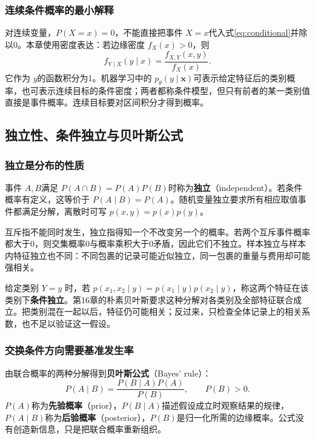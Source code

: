 \documentclass[UTF8,fontset=none,zihao=-4,a4paper]{ctexart}
\newcommand{\term}[1]{\textbf{#1}}
\numberwithin{equation}{section}
\numberwithin{figure}{section}
\begin{document}
\subsubsection{连续条件概率的最小解释}
对连续变量，$P(X=x)=0$，不能直接把事件 $X=x$代入式\eqref{eq:conditional}并除以0。本章使用密度表达：若边缘密度 $f_X(x)>0$，则
\[
 f_{Y\mid X}(y\mid x)=\frac{f_{X,Y}(x,y)}{f_X(x)}.
\]
它作为 $y$的函数积分为1。机器学习中的 $p_\theta(y\mid\symbf x)$可表示给定特征后的类别概率，也可表示连续目标的条件密度；两者都称条件模型，但只有前者的某一类别值直接是事件概率。连续目标要对区间积分才得到概率。

\subsection{独立性、条件独立与贝叶斯公式}
\subsubsection{独立是分布的性质}
事件 $A,B$满足 $P(A\cap B)=P(A)P(B)$时称为\term{独立}（independent）。若条件概率有定义，这等价于 $P(A\mid B)=P(A)$。随机变量独立要求所有相应取值事件都满足分解，离散时可写 $p(x,y)=p(x)p(y)$。

互斥指不能同时发生，独立指得知一个不改变另一个的概率。若两个互斥事件概率都大于0，则交集概率0与概率乘积大于0矛盾，因此它们不独立。样本独立与样本内特征独立也不同：不同包裹的记录可能近似独立，同一包裹的重量与费用却可能强相关。

给定类别 $Y=y$ 时，若 $p(x_1,x_2\mid y)=p(x_1\mid y)p(x_2\mid y)$，称这两个特征在该类别下\term{条件独立}。第16章的朴素贝叶斯要求这种分解对各类别及全部特征联合成立。把类别混在一起以后，特征仍可能相关；反过来，只检查全体记录上的相关系数，也不足以验证这一假设。

\subsubsection{交换条件方向需要基准发生率}
由联合概率的两种分解得到\term{贝叶斯公式}（Bayes' rule）：
\begin{equation}\label{eq:bayes}
 P(A\mid B)=\frac{P(B\mid A)P(A)}{P(B)},\qquad P(B)>0.
\end{equation}
$P(A)$称为\term{先验概率}（prior），$P(B\mid A)$描述假设成立时观察结果的规律，$P(A\mid B)$称为\term{后验概率}（posterior），$P(B)$是归一化所需的边缘概率。公式没有创造新信息，只是把联合概率重新组织。
\end{document}
